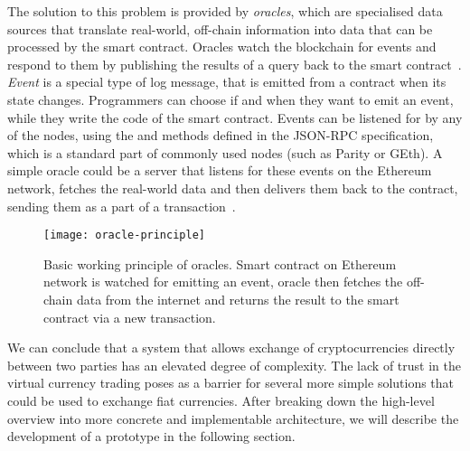 The solution to this problem is provided by \textit{oracles}, which are specialised data sources that translate real-world, off-chain information into data that can be processed by the smart contract. Oracles watch the blockchain for events and respond to them by publishing the results of a query back to the smart contract~\cite{JohnWeldon2016BuildingContract}. \textit{Event} is a special type of log message, that is emitted from a contract when its state changes. Programmers can choose if and when they want to emit an event, while they write the code of the smart contract. Events can be listened for by any of the nodes, using the  and  methods defined in the JSON-RPC specification\footnotemark, which is a standard part of commonly used nodes (such as Parity or GEth). A simple oracle could be a server that listens for these events on the Ethereum network, fetches the real-world data and then delivers them back to the contract, sending them as a part of a transaction~\cite{JulesDourlens2017Oracles:Blockchain, 2018OraclizeDocumentation}. 
% 
% 
\begin{figure}[ht]
    \centering
    \texttt{[image: oracle-principle]}
    \caption{Basic working principle of oracles. Smart contract on Ethereum network is watched for emitting an event, oracle then fetches the off-chain data from the internet and returns the result to the smart contract via a new transaction.}
    \label{fig:oracles-principle}
\end{figure}

We can conclude that a system that allows exchange of cryptocurrencies directly between two parties has an elevated degree of complexity. The lack of trust in the virtual currency trading poses as a barrier for several more simple solutions that could be used to exchange fiat currencies. After breaking down the high-level overview into more concrete and implementable architecture, we will describe the development of a prototype in the following section.